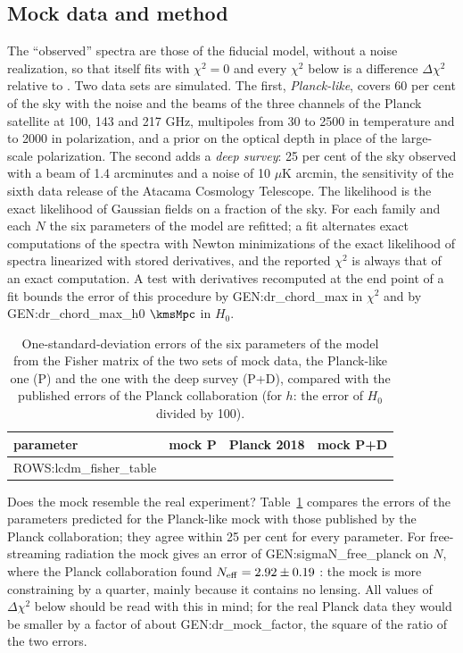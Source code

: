 \subsection{Mock data and method}

The ``observed'' spectra are those of the fiducial \LCDM{} model, without a noise realization, so
that \LCDM{} itself fits with $\chi^2=0$ and every $\chi^2$ below is a difference $\Delta\chi^2$
relative to \LCDM. Two data sets are simulated. The first, \emph{Planck-like}, covers 60 per cent of
the sky with the noise and the beams of the three channels of the Planck satellite at 100, 143 and
217 GHz, multipoles from 30 to 2500 in temperature and to 2000 in polarization, and a prior on the
optical depth in place of the large-scale polarization. The second adds a \emph{deep survey}: 25 per
cent of the sky observed with a beam of 1.4 arcminutes and a noise of 10 $\mu$K arcmin, the
sensitivity of the sixth data release of the Atacama Cosmology Telescope. The likelihood is the exact
likelihood of Gaussian fields on a fraction of the sky. For each family and each $N$ the six
parameters of the \LCDM{} model are refitted; a fit alternates exact computations of the spectra with
Newton minimizations of the exact likelihood of spectra linearized with stored derivatives, and the
reported $\chi^2$ is always that of an exact computation. A test with derivatives recomputed at the
end point of a fit bounds the error of this procedure by {{GEN:dr_chord_max}} in $\chi^2$ and by
{{GEN:dr_chord_max_h0}} $\kmsMpc$ in $H_0$.

\begin{table}
\caption{\label{tab:fisher}One-standard-deviation errors of the six parameters of the \LCDM{} model
from the Fisher matrix of the two sets of mock data, the Planck-like one (P) and the one with the
deep survey (P+D), compared with the published errors of the Planck collaboration
\cite{Planck2018VI} (for $h$: the error of $H_0$ divided by 100).}
\begin{ruledtabular}
\begin{tabular}{lccc}
parameter & mock P & Planck 2018 & mock P+D \\
\hline
{{ROWS:lcdm_fisher_table}}
\end{tabular}
\end{ruledtabular}
\end{table}

Does the mock resemble the real experiment? Table~\ref{tab:fisher} compares the errors of the
\LCDM{} parameters predicted for the Planck-like mock with those published by the Planck
collaboration; they agree within 25 per cent for every parameter. For free-streaming radiation the
mock gives an error of {{GEN:sigmaN_free_planck}} on $N$, where the Planck collaboration found
$N_{\rm eff}=2.92\pm0.19$ \cite{Planck2018VI}: the mock is more constraining by a quarter, mainly
because it contains no lensing. All values of $\Delta\chi^2$ below should be read with this in mind;
for the real Planck data they would be smaller by a factor of about {{GEN:dr_mock_factor}}, the
square of the ratio of the two errors.

